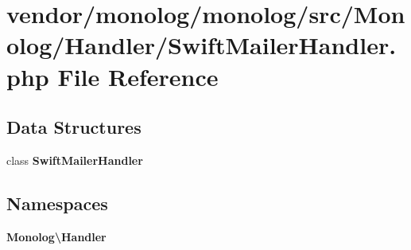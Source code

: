 \section{vendor/monolog/monolog/src/\+Monolog/\+Handler/\+Swift\+Mailer\+Handler.php File Reference}
\label{_swift_mailer_handler_8php}
\subsection*{Data Structures}
\begin{DoxyCompactItemize}
\item 
class {\bf Swift\+Mailer\+Handler}
\end{DoxyCompactItemize}
\subsection*{Namespaces}
\begin{DoxyCompactItemize}
\item 
 {\bf Monolog\textbackslash{}\+Handler}
\end{DoxyCompactItemize}
